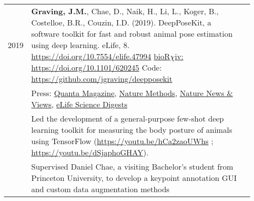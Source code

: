 \documentclass[letterpaper,10pt,oneside]{article}
\newcommand{\tabitem}{\hspace{2mm}\textbullet\hspace{2mm}}
\begin{document}
\begin{small}
\begin{longtable}{@{} l p{5in}l}
\large{2019}
 &\textbf{Graving, J.M.}, Chae, D., Naik, H., Li, L., Koger, B., Costelloe, B.R., Couzin, I.D. (2019). DeepPoseKit, a software toolkit for fast and robust animal pose estimation using deep learning. eLife, 8. \href{https://doi.org/10.7554/elife.47994}{https://doi.org/10.7554/elife.47994}  \href{https://doi.org/10.1101/620245}{bioR$\chi$iv: https://doi.org/10.1101/620245} Code: \href{https://github.com/jgraving/deepposekit}{ https://github.com/jgraving/deepposekit} \\
 &Press: \href{https://www.quantamagazine.org/to-decode-the-brain-scientists-automate-the-study-of-behavior-20191210/}{Quanta Magazine}, 
 \href{https://doi.org/10.1038/s41592-019-0678-2}{Nature Methods},
 \href{https://doi.org/10.1038/d41586-019-02942-5}{Nature News \& Views},
 \href{https://elifesciences.org/digests/47994/machine-learning-animal-poses-to-understand-behavior}{eLife Science Digests}
 \vspace{2mm} \\
 & 	\tabitem Led the development of a general-purpose few-shot deep learning toolkit for measuring the body posture of animals using TensorFlow (\href{https://youtu.be/hCa2zaoUWhs}{https://youtu.be/hCa2zaoUWhs} \hspace{1mm}; \href{https://youtu.be/dSjaphoGHAY}{https://youtu.be/dSjaphoGHAY}). \vspace{1mm}  \\
  & 	\tabitem Supervised Daniel Chae, a visiting Bachelor's student from Princeton University, to develop a keypoint annotation GUI and custom data augmentation methods \vspace{5mm}\\


\end{longtable}
\end{small}
\end{document}
